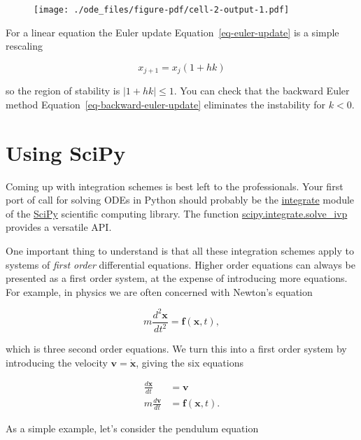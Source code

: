 \documentclass[
  letterpaper,
  DIV=11,
  numbers=noendperiod]{scrreprt}
\theoremstyle{definition}
\theoremstyle{remark}
\begin{document}
\begin{figure}[H]

{\centering \texttt{[image: ./ode\_files/figure-pdf/cell-2-output-1.pdf]}

}

\end{figure}

For a linear equation the Euler update Equation~\ref{eq-euler-update} is
a simple rescaling

\[
x_{j+1} = x_j(1 + hk)
\]

so the region of stability is \(|1 + hk|\leq 1\). You can check that the
backward Euler method Equation~\ref{eq-backward-euler-update} eliminates
the instability for \(k<0\).

\hypertarget{using-scipy}{%
\section{Using SciPy}\label{using-scipy}}

Coming up with integration schemes is best left to the professionals.
Your first port of call for solving ODEs in Python should probably be
the
\href{https://docs.scipy.org/doc/scipy/tutorial/integrate.html}{integrate}
module of the \href{https://scipy.org/}{SciPy} scientific computing
library. The function
\href{https://docs.scipy.org/doc/scipy/reference/generated/scipy.integrate.solve_ivp.html\#r179348322575-1}{scipy.integrate.solve\_ivp}
provides a versatile API.

One important thing to understand is that all these integration schemes
apply to systems of \emph{first order} differential equations. Higher
order equations can always be presented as a first order system, at the
expense of introducing more equations. For example, in physics we are
often concerned with Newton's equation

\[
m\frac{d^2 \mathbf{x}}{dt^2} = \mathbf{f}(\mathbf{x},t),
\]

which is three second order equations. We turn this into a first order
system by introducing the velocity \(\mathbf{v}=\dot{\mathbf{x}}\),
giving the six equations

\[
\begin{align}
\frac{d\mathbf{x}}{dt} &= \mathbf{v}\\
m\frac{d \mathbf{v}}{dt} &= \mathbf{f}(\mathbf{x},t).
\end{align}
\]

As a simple example, let's consider the pendulum equation
\end{document}
